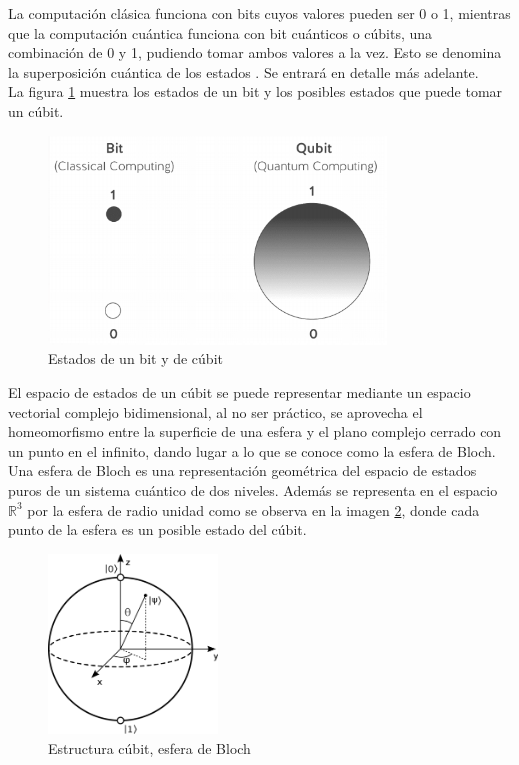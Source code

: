 La computación clásica funciona con bits cuyos valores pueden ser 0 o 1, mientras que la computación cuántica funciona con bit cuánticos o cúbits, una combinación de 0 y 1, pudiendo tomar ambos valores a la vez. Esto se denomina la superposición cuántica de los estados \cite{computacion-cuantica-criptografia}. Se entrará en detalle más adelante.\\

La figura \ref{fig:bit-cubit} muestra los estados de un bit y los posibles estados que puede tomar un cúbit. \\

\begin{figure}[H]
	\centering
	\includegraphics[width=0.8\textwidth]{figuras/bit_cubit.png}
	\caption{Estados de un bit y de cúbit \cite{clasica-vs-cuantica}}
	\label{fig:bit-cubit}
\end{figure}

El espacio de estados de un cúbit se puede representar mediante un espacio vectorial complejo bidimensional, al no ser práctico, se aprovecha el homeomorfismo entre la superficie de una esfera y el plano complejo cerrado con un punto en el infinito, dando lugar a lo que se conoce como la esfera de Bloch.\\

Una esfera de Bloch es una representación geométrica del espacio de estados puros de un sistema cuántico de dos niveles. Además se representa en el espacio $\mathds{R}^3$ por la esfera de radio unidad como se observa en la imagen \ref{fig:esfera-bloch}, donde cada punto de la esfera es un posible estado del cúbit.\\


\begin{figure}[H]
	\centering
	\includegraphics[width=0.4\textwidth]{figuras/esfera_bloch.png}
	\caption{Estructura cúbit, esfera de Bloch \cite{esfera-bloch}}
	\label{fig:esfera-bloch}
\end{figure}

